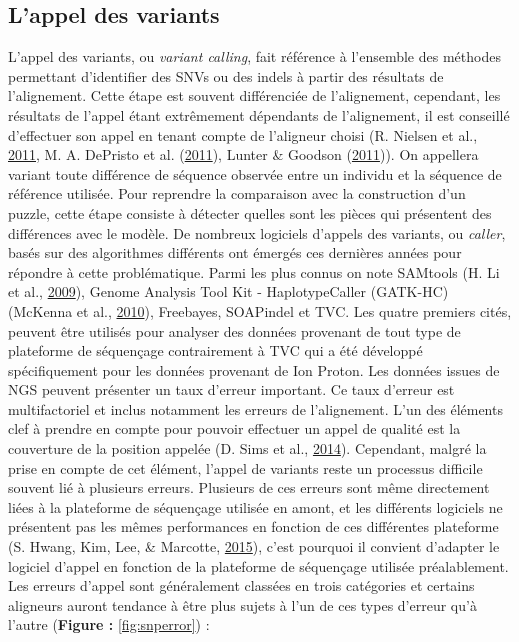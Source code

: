 \documentclass[12pt,twoside]{reedthesis}
\theoremstyle{definition}
\theoremstyle{definition}
\theoremstyle{remark}
\begin{document}
  \newpage
  
  \hypertarget{varcall}{\subsection{L'appel des variants}\label{varcall}}
  
  L'appel des variants, ou \emph{variant calling}, fait référence à
  l'ensemble des méthodes permettant d'identifier des SNVs ou des indels à
  partir des résultats de l'alignement. Cette étape est souvent
  différenciée de l'alignement, cependant, les résultats de l'appel étant
  extrêmement dépendants de l'alignement, il est conseillé d'effectuer son
  appel en tenant compte de l'aligneur choisi (R. Nielsen et al.,
  \protect\hyperlink{ref-Nielsen2011}{2011}, M. A. DePristo et al.
  (\protect\hyperlink{ref-DePristo2011}{2011}), Lunter \& Goodson
  (\protect\hyperlink{ref-Lunter2011}{2011})). On appellera variant toute
  différence de séquence observée entre un individu et la séquence de
  référence utilisée. Pour reprendre la comparaison avec la construction
  d'un puzzle, cette étape consiste à détecter quelles sont les pièces qui
  présentent des différences avec le modèle. De nombreux logiciels
  d'appels des variants, ou \emph{caller}, basés sur des algorithmes
  différents ont émergés ces dernières années pour répondre à cette
  problématique. Parmi les plus connus on note SAMtools (H. Li et al.,
  \protect\hyperlink{ref-Li2009}{2009}), Genome Analysis Tool Kit -
  HaplotypeCaller (GATK-HC) (McKenna et al.,
  \protect\hyperlink{ref-McKenna2010}{2010}), Freebayes, SOAPindel et TVC.
  Les quatre premiers cités, peuvent être utilisés pour analyser des
  données provenant de tout type de plateforme de séquençage contrairement
  à TVC qui a été développé spécifiquement pour les données provenant de
  Ion Proton. Les données issues de NGS peuvent présenter un taux d'erreur
  important. Ce taux d'erreur est multifactoriel et inclus notamment les
  erreurs de l'alignement. L'un des éléments clef à prendre en compte pour
  pouvoir effectuer un appel de qualité est la couverture de la position
  appelée (D. Sims et al., \protect\hyperlink{ref-Sims2014}{2014}).
  Cependant, malgré la prise en compte de cet élément, l'appel de variants
  reste un processus difficile souvent lié à plusieurs erreurs. Plusieurs
  de ces erreurs sont même directement liées à la plateforme de séquençage
  utilisée en amont, et les différents logiciels ne présentent pas les
  mêmes performances en fonction de ces différentes plateforme (S. Hwang,
  Kim, Lee, \& Marcotte, \protect\hyperlink{ref-Hwang2015}{2015}), c'est
  pourquoi il convient d'adapter le logiciel d'appel en fonction de la
  plateforme de séquençage utilisée préalablement. Les erreurs d'appel
  sont généralement classées en trois catégories et certains aligneurs
  auront tendance à être plus sujets à l'un de ces types d'erreur qu'à
  l'autre (\textbf{Figure : }\ref{fig:snperror}) :
  
\end{document}
